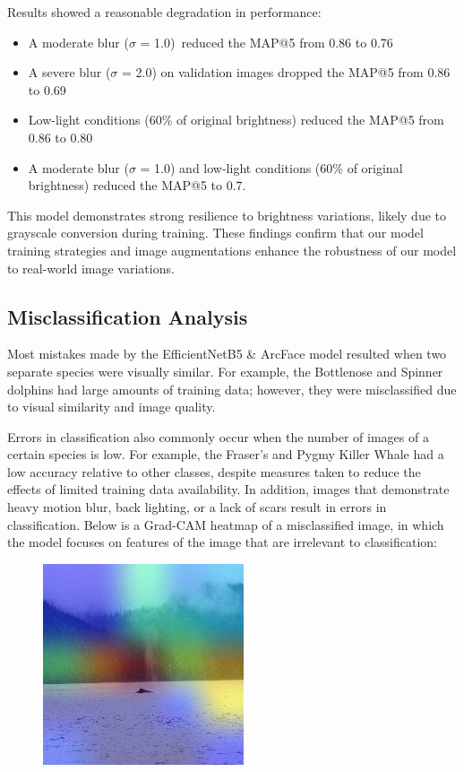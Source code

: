 \documentclass[twocolumn]{article}
\begin{document}
Results showed a reasonable degradation in performance:
 \begin{itemize}
     \item A moderate blur ($\sigma$ = 1.0)\ reduced the MAP@5 from 0.86 to 0.76
     \item A severe blur ($\sigma$ = 2.0) on validation images dropped the MAP@5 from 0.86 to 0.69
     \item Low-light conditions (60\% of original brightness) reduced the MAP@5 from 0.86 to 0.80
     \item A moderate blur ($\sigma$ = 1.0) and low-light conditions (60\% of original brightness) reduced the MAP@5 to 0.7.
 \end{itemize}

This model demonstrates strong resilience to brightness variations, likely due to grayscale conversion during training. These findings confirm that our model training strategies and image augmentations enhance the robustness of our model to real-world image variations.

\subsection{Misclassification Analysis}

Most mistakes made by the EfficientNetB5 \& ArcFace model resulted when two separate species were visually similar. For example, the Bottlenose and Spinner dolphins had large amounts of training data; however, they were misclassified due to visual similarity and image quality. 

Errors in classification also commonly occur when the number of images of a certain species is low. For example, the Fraser's and Pygmy Killer Whale had a low accuracy relative to other classes, despite measures taken to reduce the effects of limited training data availability. In addition, images that demonstrate heavy motion blur, back lighting, or a lack of scars result in errors in classification. Below is a Grad-CAM heatmap of a misclassified image, in which the model focuses on features of the image that are irrelevant to classification:
\begin{figure}
    \centering
    \includegraphics[width=0.5\linewidth]{misclassified.jpg}
\end{figure}
\end{document}
